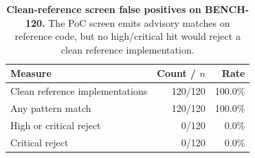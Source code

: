 \begin{table}[t]
  \centering
  \caption{\textbf{Clean-reference screen false positives on BENCH-120.}
    The PoC screen emits advisory matches on reference code, but no
    high/critical hit would reject a clean reference implementation.}
  \label{tab:screen-fp}
  \footnotesize
  \begin{tabular}{@{}lrr@{}}
    \toprule
    Measure & Count / $n$ & Rate \\
    \midrule
    Clean reference implementations & 120/120 & 100.0\% \\
    Any pattern match & 120/120 & 100.0\% \\
    High or critical reject & 0/120 & 0.0\% \\
    Critical reject & 0/120 & 0.0\% \\
    \bottomrule
  \end{tabular}
\end{table}
